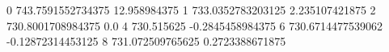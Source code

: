 0 743.7591552734375 12.958984375
1 733.0352783203125 2.235107421875
2 730.8001708984375 0.0
4 730.515625 -0.2845458984375
6 730.6714477539062 -0.12872314453125
8 731.072509765625 0.2723388671875
